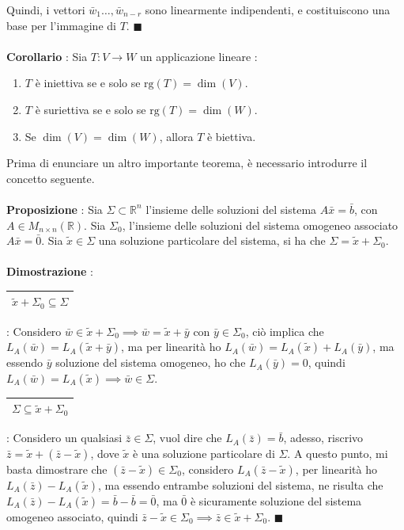 \documentclass[12pt, letterpaper]{article}
\newcommand{\R}{{\mathbb R}}
\newcommand{\rg}{{\text{rg}}}
\newcommand{\acc}{\\\hphantom{}\\}
\newcommand{\boxedMath}[1]{\begin{tabular}{|c|}\hline \texttt{#1} \\ \hline\end{tabular} :}
\begin{document}
Quindi, i vettori \(\bar w_1\dots,\bar w_{n-r}\) sono linearmente indipendenti, e costituiscono una base per 
l'immagine di \(T\). \(\blacksquare\)\acc
\textbf{Corollario} : Sia \(T:V\rightarrow W\) un applicazione lineare :\begin{enumerate}
    \item  \(T\) è iniettiva se e solo se \(\rg(T)=\dim(V)\).
    \item  \(T\) è suriettiva se e solo se \(\rg(T)=\dim(W)\).
    \item Se  \(\dim(V)=\dim(W)\), allora \(T\) è biettiva.
\end{enumerate}
Prima di enunciare un altro importante teorema, è necessario introdurre il concetto seguente.\acc 
\textbf{Proposizione} : Sia \(\Sigma\subset \R^n\) l'insieme delle soluzioni del sistema \(A\bar x = \bar b\), 
con \(A\in M_{n\times n}(\R)\). Sia \(\Sigma_0\), l'insieme delle soluzioni del sistema omogeneo associato \(A\bar x = \bar 0\).
Sia \(\tilde x\in \Sigma\) una soluzione particolare del sistema, si ha che \(\Sigma=\tilde x +\Sigma_0\).\acc 
\textbf{Dimostrazione} : \boxedMath{\(\tilde x +\Sigma_0\subseteq \Sigma\)} Considero \(\bar w\in \tilde x +\Sigma_0\implies
\bar w = \tilde x +\bar y\) con \(\bar y\in \Sigma_0\), ciò implica che \(L_A(\bar w)=L_A(\tilde x +\bar y)\), ma per linearità 
ho \(L_A(\bar w)=L_A(\tilde x) +L_A(\bar y)\), ma essendo \(\bar y\) soluzione del sistema omogeneo, ho che \(L_A(\bar y)=0\),
quindi \(L_A(\bar w)=L_A(\tilde x)\implies \bar w\in \Sigma\).\\
\boxedMath{\(\Sigma\subseteq \tilde x +\Sigma_0\)} Considero un qualsiasi \(\bar z\in \Sigma\), vuol dire che 
\(L_A(\bar z)=\bar b\), adesso, riscrivo \(\bar z=\tilde x +(\bar z - \tilde x)\), dove \(\tilde x\) è una soluzione 
particolare di \(\Sigma\). A questo punto, mi basta dimostrare che \((\bar z - \tilde x)\in \Sigma_0\), considero 
\(L_A(\bar z-\tilde x)\), per linearità ho \(L_A(\bar z)-L_A(\tilde x)\), ma essendo entrambe soluzioni del sistema, 
ne risulta che \(L_A(\bar z)-L_A(\tilde x)=\bar b-\bar b=\bar 0\), ma \(\bar 0\) è sicuramente soluzione del 
sistema omogeneo associato, quindi \(\bar z - \tilde x\in \Sigma_0\implies \bar z \in \tilde x+ \Sigma_0\). \(\blacksquare\)
\end{document}
